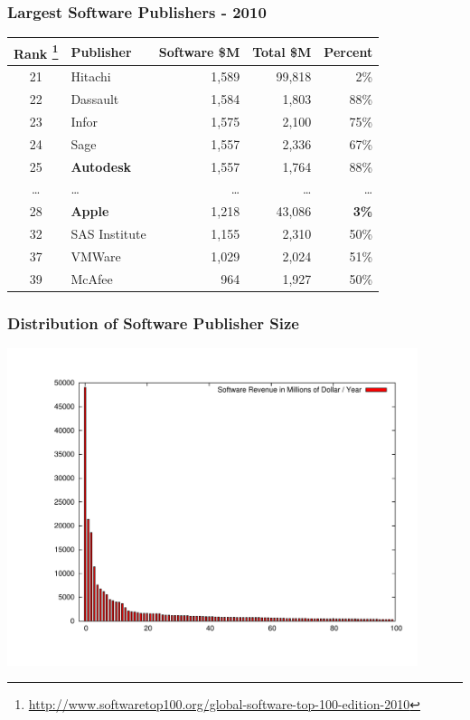 \documentclass[18pt]{beamer}
\begin{document}
{
\begin{frame}
\frametitle{Largest Software Publishers - 2010}

\begin{center}
\begin{tabular}{clrrr}
\hline
\textbf{Rank
\footnote{
\url{http://www.softwaretop100.org/global-software-top-100-edition-2010}}
} &\textbf{Publisher} &	\textbf{Software \$M} & \textbf{Total \$M} & \textbf{Percent} \\
\hline
\hline
21 & Hitachi & 1,589 & 99,818 & 2\% \\
22 & Dassault & 1,584 & 1,803 & 88\% \\
23 & Infor & 1,575 & 2,100 & 75\% \\
24 & Sage & 1,557 & 2,336 & 67\% \\
25 & \textbf{Autodesk} & 1,557 & 1,764 & 88\% \\
\ldots & \ldots & \ldots & \ldots & \ldots \\
28 & \textbf{Apple} & 1,218 &	43,086 & 	\textbf{3\%}  \\
32 & SAS Institute & 1,155 	& 	2,310 &	50\%  \\
37 & VMWare & 1,029 &	2,024 & 	51\%  \\
39 & McAfee & 964 &	1,927 & 50\% \\
\end{tabular}

\end{center}
\end{frame}
}


\begin{frame}
\frametitle{Distribution of Software Publisher Size}
  \includegraphics[width=0.9\textwidth,height=0.9\paperheight]{../Art/LargestSoftwarePublishersPlot.pdf}
\end{frame}
\end{document}
